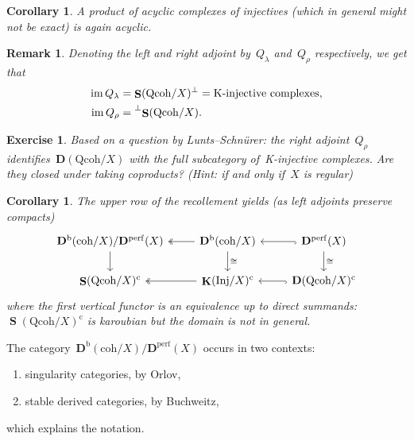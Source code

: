 \documentclass[10pt,a4paper]{article}
\theoremstyle{lecture}
\newtheorem{corollary}[theorem]{Corollary}
\newtheorem{exercise}[theorem]{Exercise}
\newtheorem{remark}[theorem]{Remark}
\newcommand\bounded{\ensuremath{\mathrm{b}}}
\newcommand\cc{\ensuremath{\mathrm{c}}}
\newcommand\coh{\ensuremath{\mathrm{coh}}}
\newcommand\derived{\ensuremath{\mathbf{D}}}
\newcommand\Inj{\ensuremath{\mathrm{Inj}}}
\newcommand\perf{\ensuremath{\mathrm{perf}}}
\newcommand\Qcoh{\ensuremath{\mathrm{Qcoh}}}
\DeclareMathOperator\image{im}
\DeclareMathOperator\KKK{\mathbf{K}}
\DeclareMathOperator\SSing{\mathbf{S}}
\begin{document}
\begin{corollary}
  A product of acyclic complexes of injectives (which in general might not be exact) is again acyclic.
\end{corollary}

\begin{remark}
  Denoting the left and right adjoint by~$Q_\lambda$ and~$Q_\rho$ respectively, we get that
  \begin{equation}
    \begin{aligned}
      \image Q_\lambda&=\SSing(\Qcoh/X)^\perp=\text{K-injective complexes}, \\
      \image Q_\rho&=\prescript{\perp}{}{\SSing(\Qcoh/X)}.
    \end{aligned}
  \end{equation}
\end{remark}

\begin{exercise}
  Based on a question by Lunts--Schn\"urer: the right adjoint~$Q_\rho$ identifies~$\derived(\Qcoh/X)$ with the full subcategory of~K-injective complexes. Are they closed under taking coproducts? (Hint: if and only if~$X$ is regular)
\end{exercise}

\begin{corollary}
  The upper row of the recollement yields (as left adjoints preserve compacts)
  \begin{equation}
    \begin{tikzcd}
      \derived^\bounded(\coh/X)/\derived^\perf(X) \arrow{d} & \derived^\bounded(\coh/X) \arrow{d}{\cong} \arrow[two heads]{l} & \derived^\perf(X) \arrow{d}{\cong} \arrow[hook]{l} \\
      \SSing(\Qcoh/X)^\cc & \KKK(\Inj/X)^\cc \arrow[two heads]{l} & \derived(\Qcoh/X)^\cc \arrow[hook]{l}
    \end{tikzcd}
  \end{equation}
  where the first vertical functor is an equivalence up to direct summands: $\SSing(\Qcoh/X)^\cc$ is karoubian but the domain is not in general.
\end{corollary}
The category~$\derived^\bounded(\coh/X)/\derived^\perf(X)$ occurs in two contexts:
\begin{enumerate}
  \item singularity categories, by Orlov,
  \item stable derived categories, by Buchweitz,
\end{enumerate}
which explains the notation.
\end{document}
